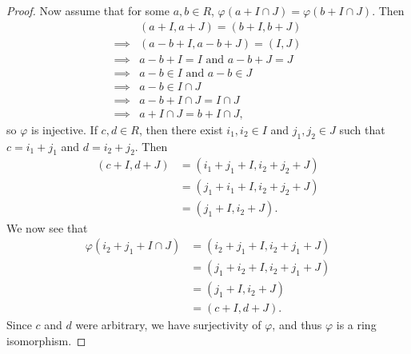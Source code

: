 \documentclass[12pt]{article}
\theoremstyle{definition}
\begin{document}
\begin{proof}
	Now assume that for some $a, b \in R$, $\varphi(a + I \cap J) = \varphi(b + I \cap J)$.
	Then \begin{align*}
		         & (a + I, a + J) = (b + I, b + J)          \\
		\implies & (a - b + I, a - b + J) = (I, J)          \\
		\implies & a - b + I = I \text{ and } a - b + J = J \\
		\implies & a - b \in I \text{ and } a - b \in J     \\
		\implies & a - b \in I \cap J                       \\
		\implies & a - b + I \cap J = I \cap J              \\
		\implies & a + I\cap J = b + I \cap J,
	\end{align*}
	so $\varphi$ is injective.
	If $c, d \in R$, then there exist $i_1, i_2 \in I$ and $j_1, j_2 \in J$ such that $c = i_1 + j_1$ and $d = i_2 + j_2$.
	Then \begin{align*}
		(c + I, d + J) & = (i_1 + j_1 + I, i_2 + j_2 + J) \\
		               & = (j_1 + i_1 + I, i_2 + j_2 + J) \\
		               & = (j_1 + I, i_2 + J).
	\end{align*}
	We now see that \begin{align*}
		\varphi(i_2 + j_1 + I \cap J) & = (i_2 + j_1 + I, i_2 + j_1 + J) \\
		                              & = (j_1 + i_2 + I, i_2 + j_1 + J) \\
		                              & = (j_1 + I, i_2 + J)             \\
		                              & = (c + I, d + J).
	\end{align*}
	Since $c$ and $d$ were arbitrary, we have surjectivity of $\varphi$, and thus $\varphi$ is a ring isomorphism.
\end{proof}
\end{document}
